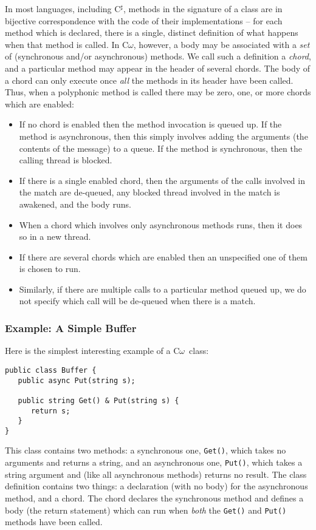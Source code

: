 \documentclass{article}
\newcommand{\comega}{\mbox{C$\omega$}}
\newcommand{\csharp}{\mbox{C$^\sharp$}}
\begin{document}
In most languages, including \csharp, methods in the signature of a
class are in bijective correspondence with the code of their
implementations -- for each method which is declared, there is a
single, distinct definition of what happens when that method is
called. In \comega, however, a body may be associated with a \emph{set}
of (synchronous and/or asynchronous) methods. We call such a
definition a \emph{chord}, and a particular method may appear in the header
of several chords. The body of a chord can only execute once \emph{all} the
methods in its header have been called. Thus, when a polyphonic method
is called there may be zero, one, or more chords which are enabled:
\begin{itemize}
\item If no chord is enabled then the method invocation is queued
up. If the method is asynchronous, then this simply involves adding
the arguments (the contents of the message) to a queue. If the method
is synchronous, then the calling thread is blocked.
\item If there is a single enabled chord, then the arguments of the
calls involved in the match are de-queued, any blocked thread involved
in the match is awakened, and the body runs.
\item When a chord which involves only asynchronous methods runs, then
it does so in a new thread.
\item If there are several chords which are enabled then an
unspecified one of them is chosen to run.
\item Similarly, if there are multiple calls to a particular method
queued up, we do not specify which call will be de-queued when there
is a match.
\end{itemize}


\subsubsection{Example: A Simple Buffer}

Here is the simplest interesting example of a \comega\ class:
\begin{verbatim}
public class Buffer {
   public async Put(string s);
   
   public string Get() & Put(string s) { 
      return s; 
   } 
} 
\end{verbatim}
This class contains two methods: a synchronous one, \verb|Get()|,
which takes no arguments and returns a string, and an asynchronous
one, \verb|Put()|, which takes a string argument and (like all
asynchronous methods) returns no result. The class definition contains
two things: a declaration (with no body) for the asynchronous method,
and a chord. The chord declares the synchronous method and defines a
body (the return statement) which can run when \emph{both} the
\verb|Get()| and \verb|Put()| methods have been called.
\end{document}
